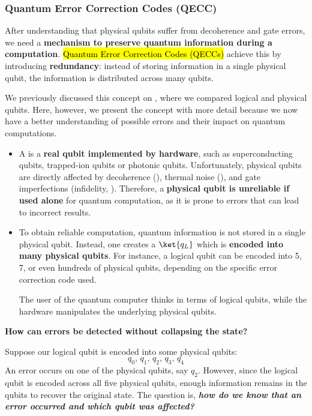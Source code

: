 \subsubsection{Quantum Error Correction Codes (QECC)}\label{sec:qecc}

After understanding that physical qubits suffer from decoherence and gate errors, we need a \textbf{mechanism to preserve quantum information during a computation}. \hl{Quantum Error Correction Codes (QECCs)} achieve this by introducing \textbf{redundancy}: instead of storing information in a single physical qubit, the information is distributed across many qubits.

\highspace
We previously discussed this concept on , where we compared logical and physical qubits. Here, however, we present the concept with more detail because we now have a better understanding of possible errors and their impact on quantum computations.
\begin{itemize}
    \item A  is a \textbf{real qubit implemented by hardware}, such as superconducting qubits, trapped-ion qubits or photonic qubits. Unfortunately, physical qubits are directly affected by decoherence (), thermal noise (), and gate imperfections (infidelity, ). Therefore, a \textbf{physical qubit is unreliable if used alone} for quantum computation, as it is prone to errors that can lead to incorrect results.


    \item To obtain reliable computation, quantum information is not stored in a single physical qubit. Instead, one creates a  $\ket{q_L}$ which is \textbf{encoded into many physical qubits}. For instance, a logical qubit can be encoded into 5, 7, or even hundreds of physical qubits, depending on the specific error correction code used.
    
    The user of the quantum computer thinks in terms of logical qubits, while the hardware manipulates the underlying physical qubits.
\end{itemize}

\begin{flushleft}
    \textcolor{Red2}{ \textbf{How can errors be detected without collapsing the state?}}
\end{flushleft}
Suppose our logical qubit is encoded into some physical qubits:
\begin{equation*}
    q_0, \, q_1, \, q_2, \, q_3, \, q_4
\end{equation*}
An error occurs on one of the physical qubits, say $q_2$. However, since the logical qubit is encoded across all five physical qubits, enough information remains in the qubits to recover the original state. The question is, \emph{\textbf{how do we know that an error occurred and which qubit was affected?}}

